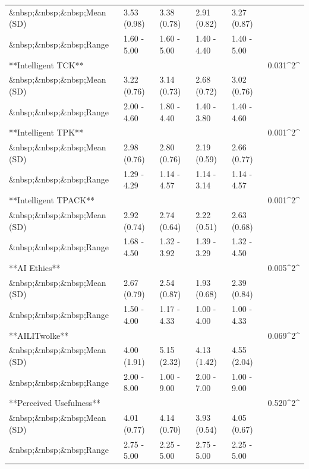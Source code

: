 \documentclass[
  letterpaper,
  DIV=11,
  numbers=noendperiod]{scrartcl}
\begin{document}
\begin{table}
{\begin{tabular}{llllll}
\&nbsp;\&nbsp;\&nbsp;Mean (SD) & 3.53 (0.98) & 3.38 (0.78) & 2.91 (0.82) & 3.27 (0.87) & \\
\addlinespace
\&nbsp;\&nbsp;\&nbsp;Range & 1.60 - 5.00 & 1.60 - 5.00 & 1.40 - 4.40 & 1.40 - 5.00 & \\
**Intelligent TCK** &  &  &  &  & 0.031\textasciicircum{}2\textasciicircum{}\\
\&nbsp;\&nbsp;\&nbsp;Mean (SD) & 3.22 (0.76) & 3.14 (0.73) & 2.68 (0.72) & 3.02 (0.76) & \\
\&nbsp;\&nbsp;\&nbsp;Range & 2.00 - 4.60 & 1.80 - 4.40 & 1.40 - 3.80 & 1.40 - 4.60 & \\
**Intelligent TPK** &  &  &  &  & 0.001\textasciicircum{}2\textasciicircum{}\\
\addlinespace
\&nbsp;\&nbsp;\&nbsp;Mean (SD) & 2.98 (0.76) & 2.80 (0.76) & 2.19 (0.59) & 2.66 (0.77) & \\
\&nbsp;\&nbsp;\&nbsp;Range & 1.29 - 4.29 & 1.14 - 4.57 & 1.14 - 3.14 & 1.14 - 4.57 & \\
**Intelligent TPACK** &  &  &  &  & 0.001\textasciicircum{}2\textasciicircum{}\\
\&nbsp;\&nbsp;\&nbsp;Mean (SD) & 2.92 (0.74) & 2.74 (0.64) & 2.22 (0.51) & 2.63 (0.68) & \\
\&nbsp;\&nbsp;\&nbsp;Range & 1.68 - 4.50 & 1.32 - 3.92 & 1.39 - 3.29 & 1.32 - 4.50 & \\
\addlinespace
**AI Ethics** &  &  &  &  & 0.005\textasciicircum{}2\textasciicircum{}\\
\&nbsp;\&nbsp;\&nbsp;Mean (SD) & 2.67 (0.79) & 2.54 (0.87) & 1.93 (0.68) & 2.39 (0.84) & \\
\&nbsp;\&nbsp;\&nbsp;Range & 1.50 - 4.00 & 1.17 - 4.33 & 1.00 - 4.00 & 1.00 - 4.33 & \\
**AILITwolke** &  &  &  &  & 0.069\textasciicircum{}2\textasciicircum{}\\
\&nbsp;\&nbsp;\&nbsp;Mean (SD) & 4.00 (1.91) & 5.15 (2.32) & 4.13 (1.42) & 4.55 (2.04) & \\
\addlinespace
\&nbsp;\&nbsp;\&nbsp;Range & 2.00 - 8.00 & 1.00 - 9.00 & 2.00 - 7.00 & 1.00 - 9.00 & \\
**Perceived Usefulness** &  &  &  &  & 0.520\textasciicircum{}2\textasciicircum{}\\
\&nbsp;\&nbsp;\&nbsp;Mean (SD) & 4.01 (0.77) & 4.14 (0.70) & 3.93 (0.54) & 4.05 (0.67) & \\
\&nbsp;\&nbsp;\&nbsp;Range & 2.75 - 5.00 & 2.25 - 5.00 & 2.75 - 5.00 & 2.25 - 5.00 & \\
\bottomrule
\end{tabular}

}
\end{table}
\end{document}
